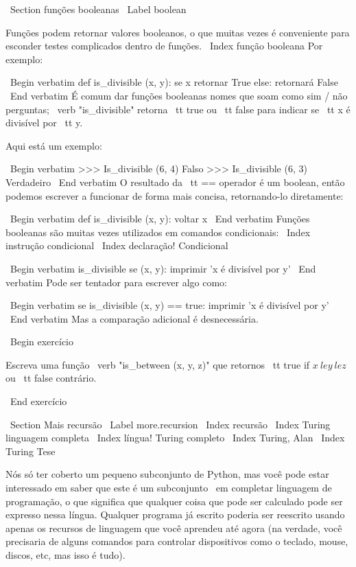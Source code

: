 \documentclass[10pt]{book}
\begin{document}
\begin {itemize}
{{{{\ Section {} funções booleanas
\ Label {boolean}

Funções podem retornar valores booleanos, o que muitas vezes é conveniente para esconder
testes complicados dentro de funções. \ Index {função booleana}
Por exemplo:

\ Begin {verbatim}
def is_divisible (x, y):
    se x%
        retornar True
    else:
        retornará False
\ End {verbatim}
%
É comum dar funções booleanas nomes que soam como sim / não
perguntas; \ verb "is_divisible" retorna {\ tt true} ou {\ tt false}
para indicar se {\ tt x} é divisível por {\ tt y}.

Aqui está um exemplo:

\ Begin {verbatim}
>>> Is_divisible (6, 4)
Falso
>>> Is_divisible (6, 3)
Verdadeiro
\ End {verbatim}
%
O resultado da {\ tt ==} operador é um boolean, então podemos escrever a
funcionar de forma mais concisa, retornando-lo diretamente:

\ Begin {verbatim}
def is_divisible (x, y):
    voltar x%
\ End {verbatim}
%
Funções booleanas são muitas vezes utilizados em comandos condicionais:
\ Index {instrução condicional}
\ Index {declaração! Condicional}

\ Begin {verbatim}
is_divisible se (x, y):
    imprimir 'x é divisível por y'
\ End {verbatim}
%
Pode ser tentador para escrever algo como:

\ Begin {verbatim}
se is_divisible (x, y) == true:
    imprimir 'x é divisível por y'
\ End {verbatim}
%
Mas a comparação adicional é desnecessária.

\ Begin {} exercício

Escreva uma função \ verb "is_between (x, y, z)" que
retornos {\ tt true} if $ x \ le y \ le z $ ou {\ tt false} contrário.

\ End {} exercício


\ Section {Mais recursão}
\ Label {} more.recursion
\ Index {recursão}
\ Index {Turing linguagem completa}
\ Index {língua! Turing completo}
\ Index {Turing, Alan}
\ Index {Turing Tese}

Nós só ter coberto um pequeno subconjunto de Python, mas você pode
estar interessado em saber que este é um subconjunto {\ em completar}
linguagem de programação, o que significa que qualquer coisa que pode ser
calculado pode ser expresso nessa língua. Qualquer programa já escrito
poderia ser reescrito usando apenas os recursos de linguagem que você aprendeu
até agora (na verdade, você precisaria de alguns comandos para controlar dispositivos
como o teclado, mouse, discos, etc, mas isso é tudo).

}}}}
\end{itemize}
\end{document}
